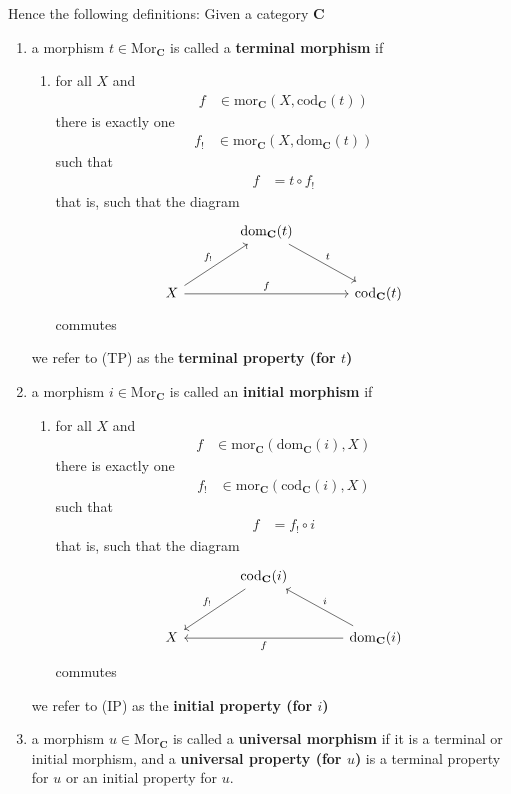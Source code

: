 Hence the following definitions: Given a category $\mathbf{C}$
\begin{enumerate}
\item[(1)]
a morphism $t \in \mathrm{Mor}_{\mathbf{C}}$ is called a \textbf{terminal morphism} if
\begin{enumerate}
\item[(TP)]
for all $X$ and
\begin{align*}
  f
  &\in
  \mathrm{mor}_{\mathbf{C}}(X,\mathrm{cod}_{\mathbf{C}}(t))
\end{align*}
there is exactly one
\begin{align*}
  f_{!}
  &\in
  \mathrm{mor}_{\mathbf{C}}(X,\mathrm{dom}_{\mathbf{C}}(t))
\end{align*}
such that
\begin{align*}
  f
  &=
  t
  \circ
  f_{!}
\end{align*}
that is, such that the diagram
\[
\begin{tikzcd}[sep=large]
  &
  \mathrm{dom}_{\mathbf{C}}(t)
  \arrow{dr}{t}
  &
  \\
  X
  \arrow{ur}{f_{!}}
  \arrow{rr}{f}
  &
  &
  \mathrm{cod}_{\mathbf{C}}(t)
\end{tikzcd}
\]
commutes
\end{enumerate}
we refer to (TP) as the \textbf{terminal property (for $t$)}
\item[(2)]
a morphism $i \in \mathrm{Mor}_{\mathbf{C}}$ is called an \textbf{initial morphism} if
\begin{enumerate}
\item[(IP)]
for all $X$ and
\begin{align*}
  f
  &\in
  \mathrm{mor}_{\mathbf{C}}(\mathrm{dom}_{\mathbf{C}}(i),X)
\end{align*}
there is exactly one
\begin{align*}
  f_{!}
  &\in
  \mathrm{mor}_{\mathbf{C}}(\mathrm{cod}_{\mathbf{C}}(i),X)
\end{align*}
such that
\begin{align*}
  f
  &=
  f_{!}
  \circ
  i
\end{align*}
that is, such that the diagram
\[
\begin{tikzcd}[sep=large]
  &
  \mathrm{cod}_{\mathbf{C}}(i)
  \arrow[swap]{dl}{f_{!}}
  &
  \\
  X
  &
  &
  \mathrm{dom}_{\mathbf{C}}(i)
  \arrow{ll}{f}
  \arrow[swap]{lu}{i}
\end{tikzcd}
\]
commutes
\end{enumerate}
we refer to (IP) as the \textbf{initial property (for $i$)}
\item[(3)]
a morphism $u \in \mathrm{Mor}_{\mathbf{C}}$ is called a \textbf{universal morphism} if it is a terminal or initial morphism, and a \textbf{universal property (for $u$)} is a terminal property for $u$ or an initial property for $u$.
\end{enumerate}
